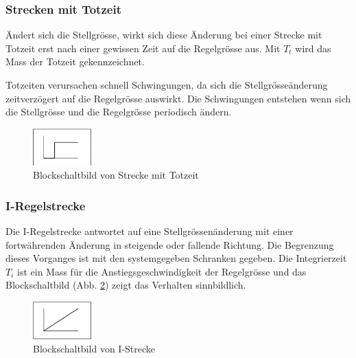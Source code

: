 \subsubsection*{Strecken mit Totzeit}
\"Andert sich die Stellgr\"osse, wirkt sich diese \"Anderung bei einer Strecke
mit Totzeit erst nach einer gewissen Zeit auf die Regelgr\"osse aus. Mit $T_t$
wird das Mass der Totzeit gekennzeichnet.

Totzeiten     verursachen     schnell     Schwingungen,    da     sich     die
Stellgr\"osse\"anderung  zeitverz\"ogert auf  die Regelgr\"osse  auswirkt. Die
Schwingungen  entstehen  wenn sich  die  Stellgr\"osse  und die  Regelgr\"osse
periodisch \"andern.
\begin{figure}[h!, width=\pagewidth]
    \begin{center}
    \includegraphics[width=0.2\textwidth]{images/TotZeit}
    \caption{Blockschaltbild von Strecke mit Totzeit}
    \label{fig:TotZeit}
    \end{center}
\end{figure}


\subsubsection*{I-Regelstrecke}
Die  I-Regelstrecke  antwortet  auf eine  Stellgr\"ossen\"anderung  mit  einer
fortw\"ahrenden   \"Anderung   in   steigende  oder   fallende   Richtung. Die
Begrenzung dieses  Vorganges ist mit den  systemgegeben Schranken gegeben. Die
Integrierzeit  $T_i$  ist  ein  Mass  f\"ur  die  Anstiegsgeschwindigkeit  der
Regelgr\"osse  und das  Blockschaltbild  (Abb.  \ref{fig:IStrecke}) zeigt  das
Verhalten sinnbildlich.

\begin{figure}[h!, width=\pagewidth]
    \begin{center}
    \includegraphics[width=0.2\textwidth]{images/IStrecke}
    \caption{Blockschaltbild von I-Strecke}
    \label{fig:IStrecke}
    \end{center}
\end{figure}



